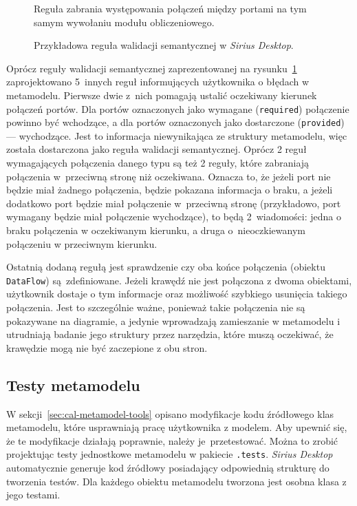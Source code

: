 \begin{figure}
	\caption{Przykładowa reguła walidacji semantycznej w \emph{Sirius
  Desktop}.}\label{rys:sirius-desktop-example-semantic-validation-rule}
  \medskip
  {\small Reguła zabrania występowania połączeń między portami na tym samym
  wywołaniu modułu obliczeniowego.}
\end{figure}

Oprócz reguły walidacji semantycznej zaprezentowanej na
rysunku~\ref{rys:sirius-desktop-example-semantic-validation-rule}
zaprojektowano 5~innych reguł informujących użytkownika o błędach w metamodelu.
Pierwsze dwie z~nich pomagają ustalić oczekiwany kierunek połączeń portów. Dla
portów oznaczonych jako wymagane (\texttt{required}) połączenie powinno być
wchodzące, a dla portów oznaczonych jako dostarczone (\texttt{provided}) ---
wychodzące. Jest to informacja niewynikająca ze struktury metamodelu, więc
została dostarczona jako reguła walidacji semantycznej. Oprócz 2 reguł
wymagających połączenia danego typu są też 2 reguły, które zabraniają
połączenia w~przeciwną stronę niż oczekiwana. Oznacza to, że jeżeli port nie
będzie miał żadnego połączenia, będzie pokazana informacja o braku, a jeżeli
dodatkowo port będzie miał połączenie w~przeciwną stronę (przykładowo, port
wymagany będzie miał połączenie wychodzące), to będą 2~wiadomości: jedna o
braku połączenia w oczekiwanym kierunku, a druga o~nieoczkiewanym połączeniu w
przeciwnym kierunku.

Ostatnią dodaną regułą jest sprawdzenie czy oba końce połączenia (obiektu
\texttt{DataFlow}) są~zdefiniowane. Jeżeli krawędź nie jest połączona z dwoma
obiektami, użytkownik dostaje o tym informacje oraz możliwość szybkiego
usunięcia takiego połączenia. Jest to szczególnie ważne, ponieważ takie
połączenia nie są pokazywane na diagramie, a jedynie wprowadzają zamieszanie w
metamodelu i utrudniają badanie jego struktury przez narzędzia, które muszą
oczekiwać, że krawędzie mogą nie być zaczepione z obu stron.

\subsection{Testy metamodelu}\label{sec:testy-metamodelu}

W sekcji~\ref{sec:cal-metamodel-tools} opisano modyfikacje kodu źródłowego klas
metamodelu, które usprawniają pracę użytkownika z modelem. Aby upewnić się, że
te modyfikacje działają poprawnie, należy je~przetestować. Można to zrobić
projektując testy
jednostkowe metamodelu w pakiecie \texttt{.tests}. \emph{Sirius Desktop}
automatycznie generuje kod źródłowy posiadający odpowiednią strukturę do
tworzenia testów. Dla każdego obiektu metamodelu tworzona jest osobna klasa z
jego testami.

